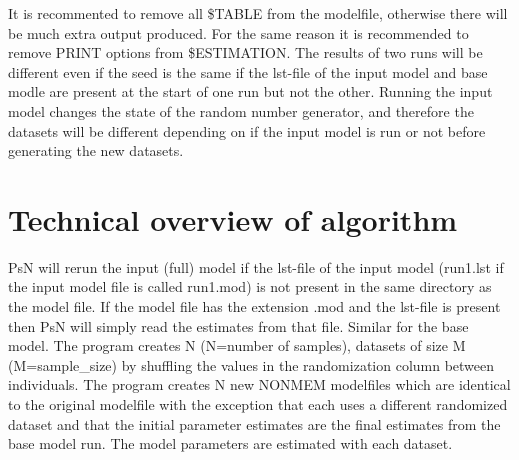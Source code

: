 It is recommented to remove all \$TABLE from the modelfile, otherwise there will be much extra output produced. For the same reason it is recommended to remove PRINT options from \$ESTIMATION. 
The results of two runs will be different even if the seed is the same if the lst-file of the input model and base modle are present at the start of one run but not the other. Running the input model changes the state of the random number generator, and therefore the datasets will be different depending on if the input model is run or not before generating the  new datasets.

\section{Technical overview of algorithm}

PsN will rerun the input (full) model if the lst-file of the input model (run1.lst if the input model file is called run1.mod) is not present in the same directory as the model file. 
If the model file has the extension .mod and the lst-file is present then PsN will simply read the estimates from that file. Similar for the base model.
The program creates N (N=number of samples), datasets of size M (M=sample\_size) by shuffling the values in the randomization column between individuals. The program creates N new NONMEM modelfiles which are identical to the original modelfile with the exception that each uses a different randomized dataset and that the initial parameter estimates are the final estimates from the base model run. The model parameters are estimated with each dataset.


